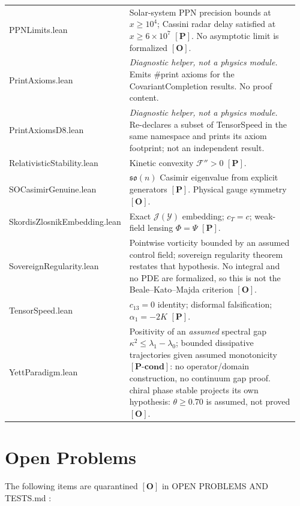 \documentclass[aps,prd,preprint,superscriptaddress,nofootinbib,amsmath,amssymb,floatfix]{revtex4-2}
\makeatletter
\DeclareRobustCommand{\rntexttt}[1]{%
  \ifmmode
    \nfss@text{\ttfamily\hyphenchar\font=-1 #1}%
  \else
    \hmode@bgroup\ttfamily\hyphenchar\font=-1 #1\egroup
  \fi}
\DeclareRobustCommand{\_}{%
    \ifmmode\nfss@text{\textunderscore}\else\textunderscore\penalty\z@\fi}%
\let\texttt\rntexttt
\makeatother
\begin{document}
\begin{longtable}{@{}>{\raggedright\arraybackslash}p{0.34\linewidth}>{\raggedright\arraybackslash}p{0.62\linewidth}@{}}
\texttt{PPNLimits.lean} & Solar-system PPN precision bounds at $x \ge 10^4$; Cassini radar delay satisfied at $x \ge 6\times10^7$ $\mathbf{[P]}$. No asymptotic limit is formalized $\mathbf{[O]}$. \\
\texttt{PrintAxioms.lean} & \emph{Diagnostic helper, not a physics module.} Emits \texttt{\#print axioms} for the \texttt{CovariantCompletion} results. No proof content. \\
\texttt{PrintAxiomsD8.lean} & \emph{Diagnostic helper, not a physics module.} Re-declares a subset of \texttt{TensorSpeed} in the same namespace and prints its axiom footprint; not an independent result. \\
\texttt{RelativisticStability.lean} & Kinetic convexity $\mathcal{F}'' > 0$ $\mathbf{[P]}$. \\
\texttt{SOCasimirGenuine.lean} & $\mathfrak{so}(n)$ Casimir eigenvalue from explicit generators $\mathbf{[P]}$. Physical gauge symmetry $\mathbf{[O]}$. \\
\texttt{Skordis\allowbreak{}Zlosnik\allowbreak{}Embedding.lean} & Exact $\mathcal{J}(\mathcal{Y})$ embedding; $c_T = c$; weak-field lensing $\Phi = \Psi$ $\mathbf{[P]}$. \\
\texttt{SovereignRegularity.lean} & Pointwise vorticity bounded by an assumed control field; \texttt{sovereign\_regularity\_theorem} restates that hypothesis. No integral and no PDE are formalized, so this is not the Beale--Kato--Majda criterion \cite{BealeKatoMajda1984} $\mathbf{[O]}$. \\
\texttt{TensorSpeed.lean} & $c_{13} = 0$ identity; disformal falsification; $\alpha_1 = -2K$ $\mathbf{[P]}$. \\
\texttt{YettParadigm.lean} & Positivity of an \emph{assumed} spectral gap $\kappa^2 \le \lambda_1-\lambda_0$; bounded dissipative trajectories given assumed monotonicity $\mathbf{[P\text{-}cond]}$: no operator/domain construction, no continuum gap proof. \texttt{chiral\_phase\_stable} projects its own hypothesis: $\theta \ge 0.70$ is assumed, not proved $\mathbf{[O]}$. \\
\end{longtable}

\section{Open Problems}
\label{sec:open}

The following items are quarantined $\mathbf{[O]}$ in \texttt{OPEN\_PROBLEMS\_AND\_TESTS.md}:
\end{document}
